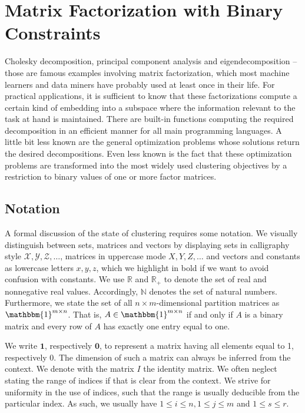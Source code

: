 \chapter{Matrix Factorization with Binary Constraints}
\label{chap:ZeroShades}
Cholesky decomposition, principal component analysis and eigendecomposition -- those are famous examples involving matrix factorization, which most machine learners and data miners have probably used at least once in their life. For practical applications, it is sufficient to know that these factorizations compute a certain kind of embedding into a subspace where the information relevant to the task at hand is maintained. There are built-in functions computing the required decomposition in an efficient manner for all main programming languages. A little bit less known are the general optimization problems whose solutions return the desired decompositions. Even less known is the fact that these optimization problems are transformed into the most widely used clustering objectives by a restriction to binary values of one or more factor matrices. 
\section{Notation}
A formal discussion of the state of clustering requires some notation. We visually distinguish between sets, matrices and vectors by displaying sets in calligraphy style $\mathcal{X},\mathcal{Y},\mathcal{Z},\ldots$, matrices in uppercase mode $X,Y,Z,\ldots$ and vectors and constants as lowercase letters $x,y,z$, which we highlight in bold if we want to avoid confusion with constants. We use $\mathbb{R}$ and $\mathbb{R}_+$ to denote the set of real and nonnegative real values. Accordingly, $\mathbb{N}$ denotes the set of natural numbers. Furthermore, we state the set of all $n\times m$-dimensional partition matrices as $\mathbbm{1}^{m\times n}$. That is, $A\in\mathbbm{1}^{m\times n}$ if and only if $A$ is a binary matrix and every row of $A$ has exactly one entry equal to one. 

We write $\mathbf{1}$, respectively $\mathbf{0}$, to represent a matrix having all elements equal to 1, respectively 0. The dimension of such a matrix can always be inferred from the context. We denote with the matrix $I$ the identity matrix.
We often neglect stating the range of indices if that is clear from the context. We strive for uniformity in the use of indices, such that the range is usually deducible from the particular index. As such, we usually have $1\leq i\leq n, 1\leq j\leq m$ and $1\leq s\leq r$.

